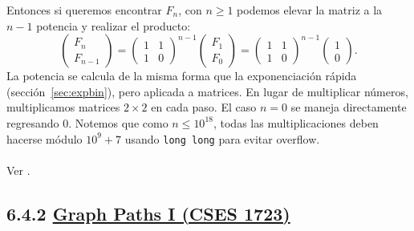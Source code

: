 Entonces si queremos encontrar $F_n$, con $n\geq 1$ podemos elevar la matriz a la $n-1$ potencia y realizar el producto:
\[
\begin{pmatrix} F_n \\ F_{n-1} \end{pmatrix}
=
\begin{pmatrix} 1 & 1 \\ 1 & 0 \end{pmatrix}^{n-1}
\begin{pmatrix} F_1 \\ F_0 \end{pmatrix}
=\begin{pmatrix} 1 & 1 \\ 1 & 0 \end{pmatrix}^{n-1}
\begin{pmatrix} 1 \\ 0 \end{pmatrix}.
\]
La potencia se calcula de la misma forma que la exponenciación rápida (sección~\ref{sec:expbin}), pero aplicada a matrices. En lugar de multiplicar números, multiplicamos matrices $2\times2$ en cada paso. El caso $n=0$ se maneja directamente regresando $0$.
Notemos que como  $n \leq 10^{18}$, todas las multiplicaciones deben hacerse módulo $10^9 + 7$ usando \texttt{long long} para evitar
overflow.
\\\\
Ver .

\subsection*{6.4.2 \href{https://cses.fi/problemset/task/1723}{Graph Paths I (CSES 1723)}}

\begin{center}
\end{center}

